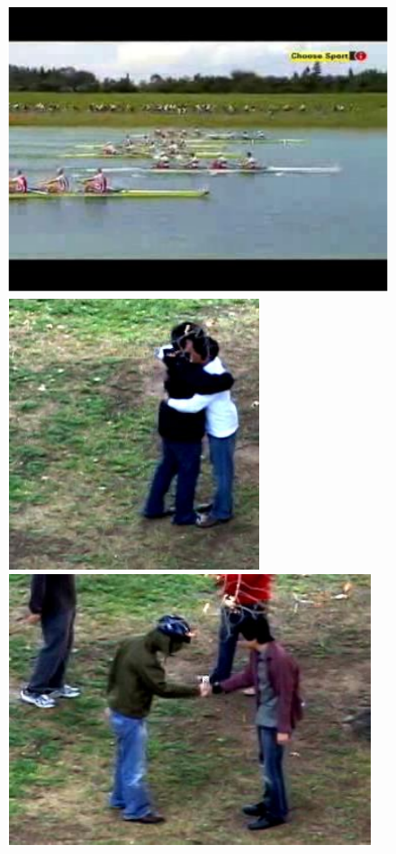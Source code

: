 \documentclass[10pt,twocolumn,letterpaper]{article}
\begin{document}
\begin{figure}[!t]
\begin{center}
\includegraphics[scale=0.305]{figures/dataset_thumb/ucf/crop_class6.pdf} \\
\includegraphics[scale=0.4]{figures/dataset_thumb/uti/crop_class1.pdf} 
\includegraphics[scale=0.4]{figures/dataset_thumb/uti/crop_class2.pdf} 

\end{center}
\end{figure}
\end{document}
